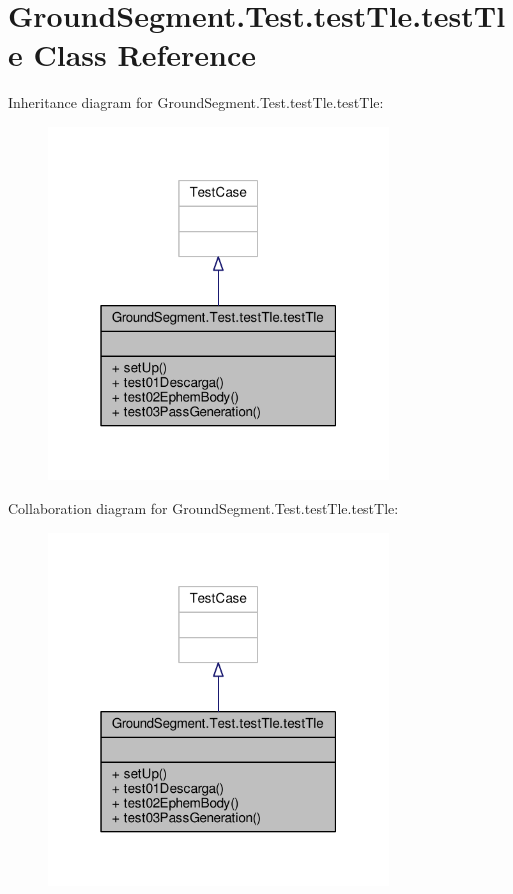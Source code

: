 \hypertarget{class_ground_segment_1_1_test_1_1test_tle_1_1test_tle}{}\section{Ground\+Segment.\+Test.\+test\+Tle.\+test\+Tle Class Reference}
\label{class_ground_segment_1_1_test_1_1test_tle_1_1test_tle}


Inheritance diagram for Ground\+Segment.\+Test.\+test\+Tle.\+test\+Tle\+:\nopagebreak
\begin{figure}[H]
\begin{center}
\leavevmode
\includegraphics[width=256pt]{class_ground_segment_1_1_test_1_1test_tle_1_1test_tle__inherit__graph}
\end{center}
\end{figure}


Collaboration diagram for Ground\+Segment.\+Test.\+test\+Tle.\+test\+Tle\+:\nopagebreak
\begin{figure}[H]
\begin{center}
\leavevmode
\includegraphics[width=256pt]{class_ground_segment_1_1_test_1_1test_tle_1_1test_tle__coll__graph}
\end{center}
\end{figure}
